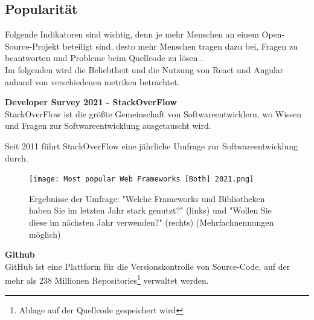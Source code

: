\subsection{Popularität}
Folgende Indikatoren sind wichtig, denn je mehr Menschen an einem Open-Source-Projekt beteiligt sind, desto mehr Menschen tragen dazu bei, Fragen zu beantworten und Probleme beim Quellcode zu lösen {\cite{LIN1}}.
\\
Im folgenden wird die Beliebtheit und die Nutzung von React und Angular anhand von verschiedenen metriken betrachtet.

\begin{flushleft}
  \textbf{Developer Survey 2021 - StackOverFlow}\\
  StackOverFlow ist die größte Gemeinschaft von Softwareentwicklern, wo Wissen und Fragen zur Softwareentwicklung ausgetauscht wird.

  Seit 2011 führt StackOverFlow eine jährliche Umfrage zur Softwareentwicklung durch.

  \begin{figure}[h]
    \centering
    \texttt{[image: Most popular Web Frameworks [Both] 2021.png]}
    \caption{ 
      Ergebnisse der Umfrage: "Welche Frameworks und Bibliotheken haben Sie im letzten Jahr stark genutzt?" (links) und "Wollen Sie diese im nächsten Jahr verwenden?" (rechts) (Mehrfachnennungen möglich)  
     {\cite{SO01}}}

  \end{figure}
\end{flushleft}

\newpage
\begin{flushleft}
  \textbf{Github}\\
  GitHub ist eine Plattform für die Versionskontrolle von Source-Code, auf der mehr als 238 Millionen Repositories\footnote{Ablage auf der Quellcode gespeichert wird} verwaltet werden{\cite{GH07}}.
\end{flushleft}

